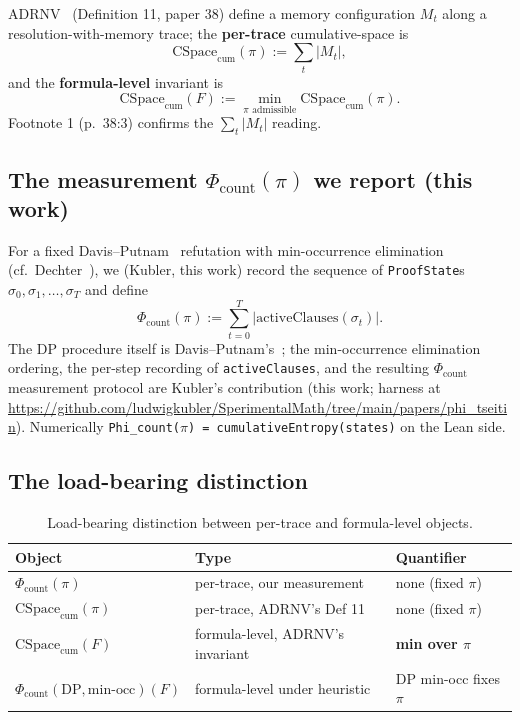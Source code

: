 \documentclass[11pt,a4paper]{article}
\theoremstyle{remark}
\begin{document}
ADRNV~\cite{ADRNV2017} (Definition 11, paper 38) define a memory
configuration $M_t$ along a resolution-with-memory trace; the
\textbf{per-trace} cumulative-space is
\[
\mathrm{CSpace}_{\mathrm{cum}}(\pi) := \sum_t |M_t|,
\]
and the \textbf{formula-level} invariant is
\[
\mathrm{CSpace}_{\mathrm{cum}}(F) := \min_{\pi \text{ admissible}}
\mathrm{CSpace}_{\mathrm{cum}}(\pi).
\]
Footnote 1 (p.~38:3) confirms the $\sum_t |M_t|$ reading.

\subsection{The measurement $\Phi_{\mathrm{count}}(\pi)$ we report (this work)}

For a fixed Davis--Putnam~\cite{DavisPutnam1960} refutation with
min-occurrence elimination (cf.\ Dechter~\cite{Dechter2003}), we
(Kubler, this work) record the sequence of \texttt{ProofState}s
$\sigma_0, \sigma_1, \ldots, \sigma_T$ and define
\[
\Phi_{\mathrm{count}}(\pi) := \sum_{t=0}^{T} |\mathrm{activeClauses}(\sigma_t)|.
\]
The DP procedure itself is Davis--Putnam's~\cite{DavisPutnam1960}; the
min-occurrence elimination ordering, the per-step recording of
\texttt{activeClauses}, and the resulting $\Phi_{\mathrm{count}}$
measurement protocol are Kubler's contribution (this work; harness at
\url{https://github.com/ludwigkubler/SperimentalMath/tree/main/papers/phi_tseitin}).
Numerically \texttt{Phi\_count($\pi$) = cumulativeEntropy(states)} on the
Lean side.

\subsection{The load-bearing distinction}

\begin{table}[H]
\centering
\small
\begin{tabularx}{\textwidth}{@{}lXl@{}}
\toprule
Object & Type & Quantifier \\
\midrule
$\Phi_{\mathrm{count}}(\pi)$ & per-trace, our measurement & none (fixed $\pi$) \\
$\mathrm{CSpace}_{\mathrm{cum}}(\pi)$ & per-trace, ADRNV's Def 11 & none (fixed $\pi$) \\
$\mathrm{CSpace}_{\mathrm{cum}}(F)$ & formula-level, ADRNV's invariant & \textbf{min over $\pi$} \\
$\Phi_{\mathrm{count}}(\mathrm{DP}, \mathrm{min\text{-}occ})(F)$ & formula-level under heuristic & DP min-occ fixes $\pi$ \\
\bottomrule
\end{tabularx}
\caption{Load-bearing distinction between per-trace and formula-level objects.}
\label{tab:loadbearing}
\end{table}
\end{document}
